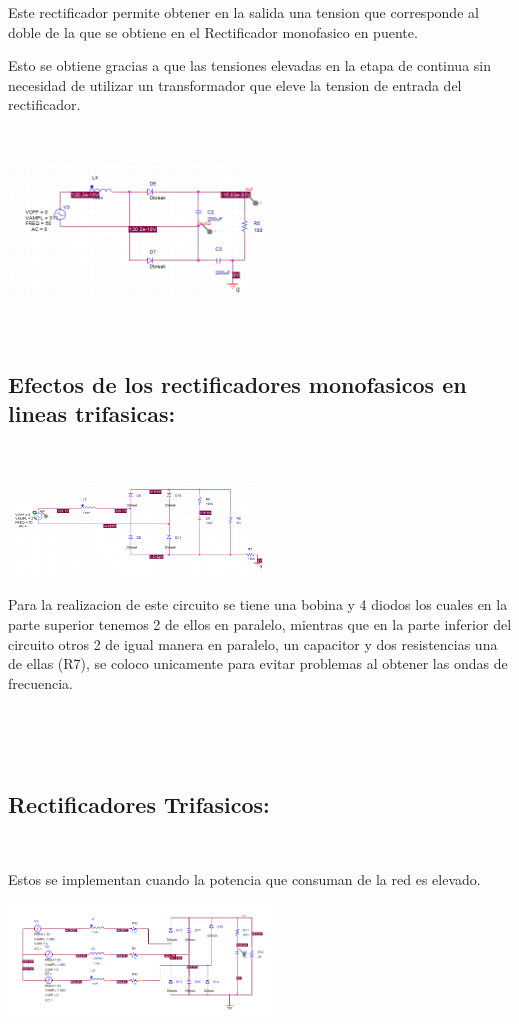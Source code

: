 \documentclass[12pt,letterpaper]{article}
\begin{document}
Este rectificador permite obtener en la salida una tension que corresponde al doble de la que se obtiene en el Rectificador monofasico en puente.
\

Esto se obtiene gracias a que las tensiones elevadas en la etapa de continua sin necesidad de utilizar un transformador que eleve la tension de entrada del rectificador.

\

\includegraphics[width=7cm]{Circuito 1-4.png} 

\

\subsection{Efectos de los rectificadores monofasicos en lineas trifasicas:}
\

\includegraphics[width=7cm]{Circuito 1-5.png}
\

Para la realizacion de este circuito se tiene una bobina y 4 diodos los cuales en la parte superior tenemos 2 de ellos en paralelo, mientras que en la parte inferior del circuito otros 2 de igual manera en paralelo, un capacitor y dos resistencias una de ellas (R7), se coloco unicamente para evitar problemas al obtener las ondas de frecuencia.

\

\

\subsection{Rectificadores Trifasicos:}
\

Estos se implementan cuando la potencia que consuman de la red es elevado.
\

\includegraphics[width=7cm]{Circuito 1-6.png} 
\
\end{document}
